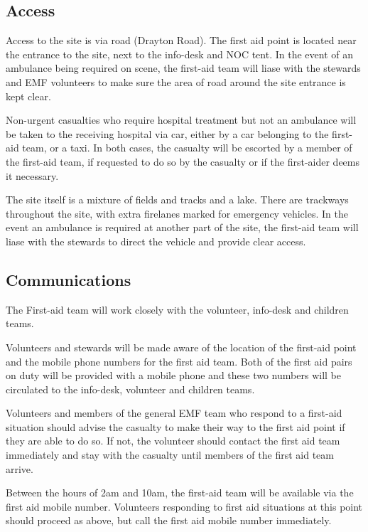\subsection{Access}

Access to the site is via road (Drayton Road). The first aid point is located near the entrance to the site, next to the info-desk and NOC tent. In the event of an ambulance being required on scene, the first-aid team will liase with the stewards and EMF volunteers to make sure the area of road around the site entrance is kept clear.

Non-urgent casualties who require hospital treatment but not an ambulance will be taken to the receiving hospital via car, either by a car belonging to the first-aid team, or a taxi. In both cases, the casualty will be escorted by a member of the first-aid team, if requested to do so by the casualty or if the first-aider deems it necessary.  

The site itself is a mixture of fields and tracks and a lake. There are trackways throughout the site, with extra firelanes marked for emergency vehicles. In the event an ambulance is required at another part of the site, the first-aid team will liase with the stewards to direct the vehicle and provide clear access. 

\subsection{Communications}

The First-aid team will work closely with the volunteer, info-desk and children teams.

Volunteers and stewards will be made aware of the location of the first-aid point and the mobile phone numbers for the first aid team. Both of the first aid pairs on duty will be provided with a mobile phone and these two numbers will be circulated to the info-desk, volunteer and children teams. 

Volunteers and members of the general EMF team who respond to a first-aid situation should advise the casualty to make their way to the first aid point if they are able to do so. If not, the volunteer should contact the first aid team immediately and stay with the casualty until members of the first aid team arrive.

Between the hours of 2am and 10am, the first-aid team will be available via the first aid mobile number. Volunteers responding to first aid situations at this point should proceed as above, but call the first aid mobile number immediately. 

